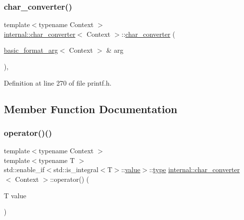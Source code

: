 \subsubsection{\texorpdfstring{char\+\_\+converter()}{char\_converter()}}
{\footnotesize\ttfamily template$<$typename Context $>$ \\
\hyperlink{classinternal_1_1char__converter}{internal\+::char\+\_\+converter}$<$ Context $>$\+::\hyperlink{classinternal_1_1char__converter}{char\+\_\+converter} (\begin{DoxyParamCaption}\item[{\hyperlink{classbasic__format__arg}{basic\+\_\+format\+\_\+arg}$<$ Context $>$ \&}]{arg }\end{DoxyParamCaption})\hspace{0.3cm}{\ttfamily [inline]}, {\ttfamily [explicit]}}



Definition at line 270 of file printf.\+h.



\subsection{Member Function Documentation}
\mbox{\label{classinternal_1_1char__converter_acb6161f2bed5a8f57727794f62922004}} 
\subsubsection{\texorpdfstring{operator()()}{operator()()}\hspace{0.1cm}{\footnotesize\ttfamily [1/2]}}
{\footnotesize\ttfamily template$<$typename Context $>$ \\
template$<$typename T $>$ \\
std\+::enable\+\_\+if$<$std\+::is\+\_\+integral$<$T$>$\+::\hyperlink{classinternal_1_1value}{value}$>$\+::\hyperlink{namespaceinternal_a8661864098ac0acff9a6dd7e66f59038}{type} \hyperlink{classinternal_1_1char__converter}{internal\+::char\+\_\+converter}$<$ Context $>$\+::operator() (\begin{DoxyParamCaption}\item[{T}]{value }\end{DoxyParamCaption})\hspace{0.3cm}{\ttfamily [inline]}}



